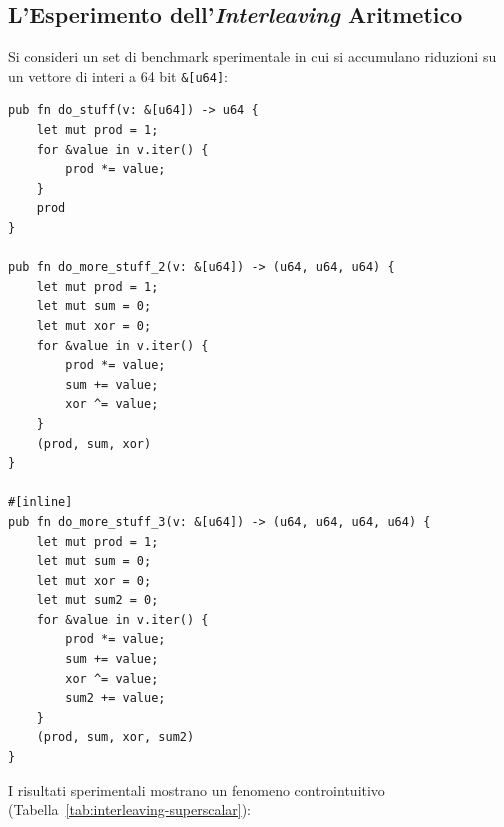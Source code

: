 \FloatBarrier
\subsection{L'Esperimento dell'\textit{Interleaving} Aritmetico}
\label{subsec:esperimento-interleaving}

Si consideri un set di benchmark sperimentale in cui si accumulano riduzioni su un vettore di interi a 64 bit \texttt{\&[u64]}:

\begin{lstlisting}[style=rustcode,caption={Funzioni di benchmark: incremento delle operazioni indipendenti nel ciclo.}]
pub fn do_stuff(v: &[u64]) -> u64 {
    let mut prod = 1;
    for &value in v.iter() {
        prod *= value;
    }
    prod
}

pub fn do_more_stuff_2(v: &[u64]) -> (u64, u64, u64) {
    let mut prod = 1;
    let mut sum = 0;
    let mut xor = 0;
    for &value in v.iter() {
        prod *= value;
        sum += value;
        xor ^= value;
    }
    (prod, sum, xor)
}

#[inline]
pub fn do_more_stuff_3(v: &[u64]) -> (u64, u64, u64, u64) {
    let mut prod = 1;
    let mut sum = 0;
    let mut xor = 0;
    let mut sum2 = 0;
    for &value in v.iter() {
        prod *= value;
        sum += value;
        xor ^= value;
        sum2 += value;
    }
    (prod, sum, xor, sum2)
}
\end{lstlisting}

I risultati sperimentali mostrano un fenomeno controintuitivo (Tabella~\ref{tab:interleaving-superscalar}):

\begin{table}[H]
\centering
\small
{}
\caption{Tempi per iterazione: eseguire tre o quattro calcoli indipendenti richiede lo stesso tempo di uno solo grazie all'architettura superscalare.}
\label{tab:interleaving-superscalar}
\end{table}

